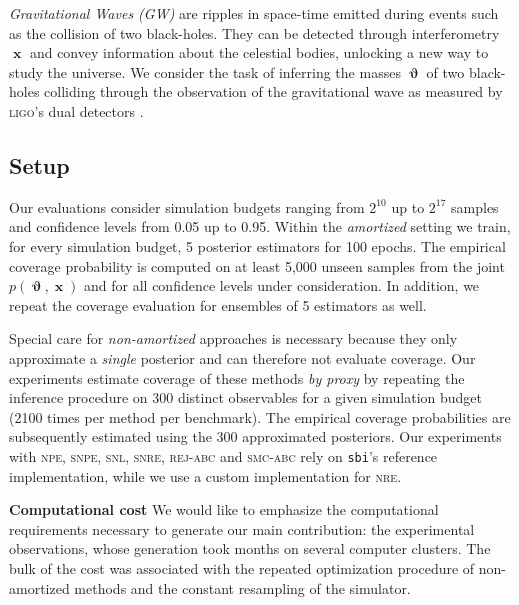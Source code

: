 \documentclass[twoside]{article}
\DeclareMathOperator{\vtheta}{\boldsymbol\vartheta}
\DeclareMathOperator{\vx}{\boldsymbol x}
\begin{document}
\emph{Gravitational Waves (GW)} are ripples in space-time emitted during events such as the collision of two black-holes. They can be detected through interferometry $\vx$ and convey information about the celestial bodies, unlocking a new way to study the universe. We consider the task of inferring the masses $\vtheta$ of two black-holes colliding through the observation of the gravitational wave as measured by \textsc{ligo}'s dual detectors \citep{lalsuite,Biwer:2018osg}.

\subsection{Setup}
Our evaluations consider simulation budgets ranging from $2^{10}$ up to $2^{17}$ samples and confidence levels from 0.05 up to 0.95. Within the \emph{amortized} setting
we train, for every simulation budget, 5 posterior estimators for 100 epochs. The empirical coverage probability is 
computed on at least 5,000 unseen samples from the joint $p(\vtheta,\vx)$ and for all confidence levels under consideration.
In addition, we repeat the coverage evaluation for ensembles of 5 estimators as well.

Special care for \emph{non-amortized} approaches is necessary because they only approximate a \emph{single} posterior and can therefore not evaluate coverage.
Our experiments estimate coverage of these methods \emph{by proxy} by repeating the inference procedure on 300 distinct observables for a given simulation budget (2100 times per method per benchmark).
The empirical coverage probabilities are subsequently estimated using the 300 approximated posteriors. 
Our experiments with \textsc{npe}, \textsc{snpe}, \textsc{snl}, \textsc{snre}, \textsc{rej-abc} and \textsc{smc-abc} rely on \texttt{sbi}'s \citep{sbi} reference implementation, while we use a custom implementation for \textsc{nre}.

{\bfseries Computational cost} We would like to emphasize the computational requirements necessary to generate our main contribution: the experimental observations, whose generation took months on several computer clusters. The bulk of the cost was associated with the repeated optimization procedure of non-amortized methods and the constant resampling of the simulator.
\end{document}
